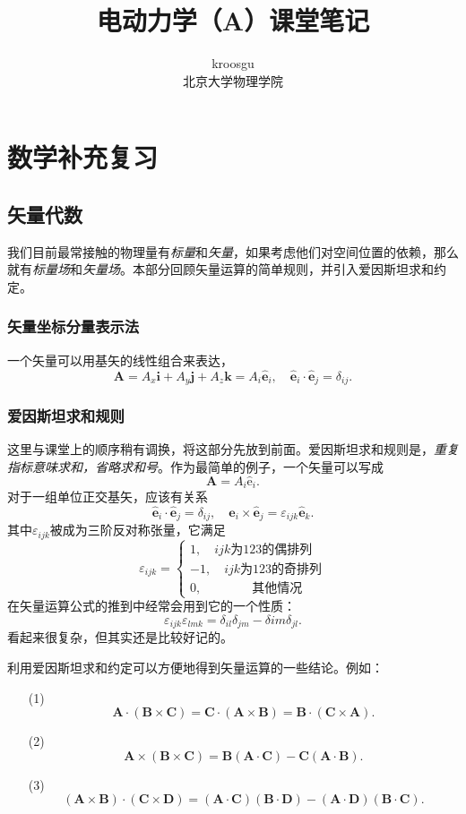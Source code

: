 \documentclass[UTF8]{ctexbook}
\title{电动力学（A）课堂笔记}
\author{kroosgu\\北京大学物理学院}
\newcommand{\e}{\mathrm{e}}
\renewcommand{\b}{\boldsymbol}
\numberwithin{equation}{chapter}
\begin{document}
	\maketitle
	
	\tableofcontents
	
	\newpage
	
	\chapter{数学补充复习}
	
	\section{矢量代数}
	
	我们目前最常接触的物理量有\emph{标量}和\emph{矢量}，如果考虑他们对空间位置的依赖，那么就有\emph{标量场}和\emph{矢量场}。本部分回顾矢量运算的简单规则，并引入爱因斯坦求和约定。
	\subsection{矢量坐标分量表示法}
	一个矢量可以用基矢的线性组合来表达，
	\[\b{A}=A_x\b{i}+A_y\b{j}+A_z\b{k}=A_i\hat{\b{e}}_i,\quad \hat{\b{e}}_i\cdot\hat{\b{e}}_j=\delta_{ij}.\]
	\subsection{爱因斯坦求和规则}
	这里与课堂上的顺序稍有调换，将这部分先放到前面。爱因斯坦求和规则是，\emph{重复指标意味求和，省略求和号}。作为最简单的例子，一个矢量可以写成
	\[\b{A}=A_i\hat{\b{\e}}_i.\]
	对于一组单位正交基矢，应该有关系
	\[\hat{\b{e}}_i\cdot\hat{\b{e}}_j=\delta_{ij},\quad \hat{\b{e}}_i\times\hat{\b{e}}_j=\varepsilon_{ijk}\hat{\b{e}}_k.\]
	其中$\varepsilon_{ijk}$被成为三阶反对称张量，它满足
	\[\varepsilon_{ijk}=\left\{\begin{gathered}1,\quad ijk\text{为123的偶排列} \\ -1,\quad ijk\text{为123的奇排列} \\ 0,\qquad\qquad \text{其他情况}\end{gathered}  \right.\]
	在矢量运算公式的推到中经常会用到它的一个性质：
	\[\varepsilon_{ijk}\varepsilon_{lmk}=\delta_{il}\delta_{jm}-\delta{im}\delta_{jl}.\]
	看起来很复杂，但其实还是比较好记的。
	
	利用爱因斯坦求和约定可以方便地得到矢量运算的一些结论。例如：
	\begin{itemize}
		\item[(1)]
		\[\b{A}\cdot(\b{B}\times\b{C})=\b{C}\cdot(\b{A}\times\b{B})=\b{B}\cdot(\b{C}\times\b{A}).\] 
		\item[(2)]
		\[\b{A}\times(\b{B}\times\b{C})=\b{B}(\b{A}\cdot\b{C})-\b{C}(\b{A}\cdot\b{B}).\]
		\item[(3)]
		\[(\b{A}\times\b{B})\cdot(\b{C}\times\b{D})=(\b{A}\cdot\b{C})(\b{B}\cdot\b{D})-(\b{A}\cdot\b{D})(\b{B}\cdot\b{C}).\]
	\end{itemize}
\end{document}
